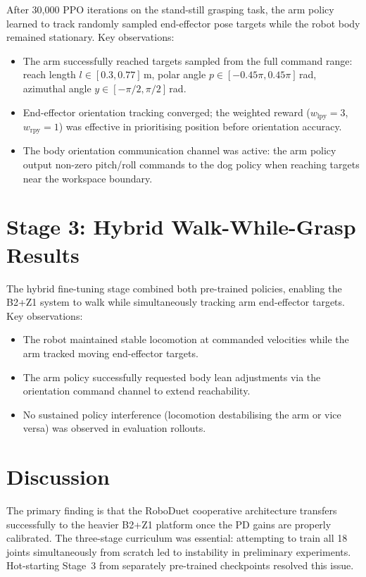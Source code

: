 After 30,000 PPO iterations on the stand-still grasping task, the arm
policy learned to track randomly sampled end-effector pose targets while
the robot body remained stationary.
Key observations:
\begin{itemize}
  \item The arm successfully reached targets sampled from the full command
        range: reach length $l \in [0.3, 0.77]$\,m, polar angle
        $p \in [-0.45\pi, 0.45\pi]$\,rad, azimuthal angle
        $y \in [-\pi/2, \pi/2]$\,rad.
  \item End-effector orientation tracking converged; the weighted reward
        ($w_{\text{lpy}}=3$, $w_{\text{rpy}}=1$) was effective in
        prioritising position before orientation accuracy.
  \item The body orientation communication channel was active: the arm
        policy output non-zero pitch/roll commands to the dog policy when
        reaching targets near the workspace boundary.
\end{itemize}

\section{Stage 3: Hybrid Walk-While-Grasp Results}

The hybrid fine-tuning stage combined both pre-trained policies, enabling
the B2+Z1 system to walk while simultaneously tracking arm end-effector
targets.
Key observations:
\begin{itemize}
  \item The robot maintained stable locomotion at commanded velocities
        while the arm tracked moving end-effector targets.
  \item The arm policy successfully requested body lean adjustments via
        the orientation command channel to extend reachability.
  \item No sustained policy interference (locomotion destabilising the
        arm or vice versa) was observed in evaluation rollouts.
\end{itemize}

\section{Discussion}

The primary finding is that the RoboDuet cooperative architecture
transfers successfully to the heavier B2+Z1 platform once the PD gains
are properly calibrated.
The three-stage curriculum was essential: attempting to train all 18
joints simultaneously from scratch led to instability in preliminary
experiments.
Hot-starting Stage~3 from separately pre-trained checkpoints resolved
this issue.


